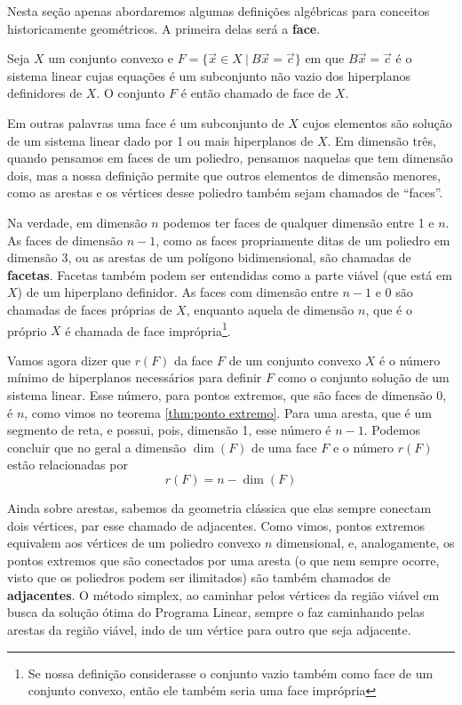 Nesta seção apenas abordaremos algumas definições algébricas para conceitos historicamente geométricos. A primeira delas será a \textbf{face}.

\begin{def:face}
	Seja $X$ um conjunto convexo e $F = \{\vec{x} \in X\ |\ B\vec{x} = \vec{c}\}$ em que $B\vec{x} = \vec{c}$ é o sistema linear cujas equações é um subconjunto não vazio dos hiperplanos definidores de $X$. O conjunto $F$ é então chamado de face de $X$.
\end{def:face}

Em outras palavras uma face é um subconjunto de $X$ cujos elementos são solução de um sistema linear dado por 1 ou mais hiperplanos de $X$. Em dimensão três, quando pensamos em faces de um poliedro, pensamos naquelas que tem dimensão dois, mas a nossa definição permite que outros elementos de dimensão menores, como as arestas e os vértices desse poliedro também sejam chamados de ``faces''.

Na verdade, em dimensão $n$ podemos ter faces de qualquer dimensão entre 1 e $n$. As faces de dimensão $n - 1$, como as faces propriamente ditas de um poliedro em dimensão 3, ou as arestas de um polígono bidimensional, são chamadas de \textbf{facetas}. Facetas também podem ser entendidas como a parte viável (que está em $X$) de um hiperplano definidor.  As faces com dimensão entre $n - 1$ e $0$ são chamadas de faces próprias de $X$, enquanto aquela de dimensão $n$, que é o próprio $X$ é chamada de face imprópria\footnote{Se nossa definição considerasse o conjunto vazio também como face de um conjunto convexo, então ele também seria uma face imprópria}.

Vamos agora dizer que $r(F)$ da face $F$ de um conjunto convexo $X$ é o número mínimo de hiperplanos necessários para definir $F$ como o conjunto solução de um sistema linear. Esse número, para pontos extremos, que são faces de dimensão 0, é $n$, como vimos no teorema \ref{thm:ponto extremo}. Para uma aresta, que é um segmento de reta, e possui, pois, dimensão 1, esse número é $n - 1$. Podemos concluir que no geral a dimensão $\dim(F)$ de uma face $F$ e o número $r(F)$ estão relacionadas por
\begin{equation*}
	r(F)= n - \dim(F)
\end{equation*}

Ainda sobre arestas, sabemos da geometria clássica que elas sempre conectam dois vértices, par esse chamado de adjacentes. Como vimos, pontos extremos equivalem aos vértices de um poliedro convexo $n$ dimensional, e, analogamente, os pontos extremos que são conectados por uma aresta (o que nem sempre ocorre, visto que os poliedros podem ser ilimitados) são também chamados de \textbf{adjacentes}. O método simplex, ao caminhar pelos vértices da região viável em busca da solução ótima do Programa Linear, sempre o faz caminhando pelas arestas da região viável, indo de um vértice para outro que seja adjacente.

